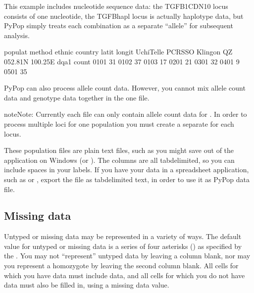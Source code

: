 \documentclass[letterpaper,10pt,english,openany,oneside]{sphinxmanual}
\begin{document}
\sphinxAtStartPar
This example includes nucleotide sequence data: the TGFB1CDN10 locus
consists of one nucleotide, the TGFBhapl locus is actually haplotype
data, but PyPop simply treats each combination as a separate “allele”
for subsequent analysis.
\def\sphinxLiteralBlockLabel{\label{\detokenize{docs/guide-chapter-usage:data-allelecount}}}
\begin{sphinxVerbatim}[commandchars=\\\{\}]
populat    method  ethnic     country    latit   longit
UchiTelle  PCR\PYGZhy{}SSO Klingon    QZ         052.81N 100.25E
dqa1  count
0101  31
0102  37
0103  17
0201  21
0301  32
0401  9
0501  35
\end{sphinxVerbatim}

\sphinxAtStartPar
PyPop can also process allele count data. However, you cannot mix allele
count data and genotype data together in the one file.

\begin{sphinxadmonition}{note}{Note:}
\sphinxAtStartPar
Currently each  file can only contain allele count data for
. In order to process multiple loci for one population you
must create a separate  for each locus.
\end{sphinxadmonition}

\sphinxAtStartPar
These population files are plain text files, such as you might save
out of the  application on Windows (or
). The columns are all tab\sphinxhyphen{}delimited, so you can
include spaces in your labels. If you have your data in a spreadsheet
application, such as  or , export the file as
tab\sphinxhyphen{}delimited text, in order to use it as PyPop data file.


\subsection{Missing data}
\label{\detokenize{docs/guide-chapter-usage:missing-data}}
\sphinxAtStartPar
Untyped or missing data may be represented in a variety of ways. The
default value for untyped or missing data is a series of four asterisks
(\sphinxcode{\sphinxupquote{****}}) as specified by the . You may not “represent”
untyped data by leaving a column blank, nor may you represent a
homozygote by leaving the second column blank. All cells for which you
have data must include data, and all cells for which you do not have
data must also be filled in, using a missing data value.
\end{document}
